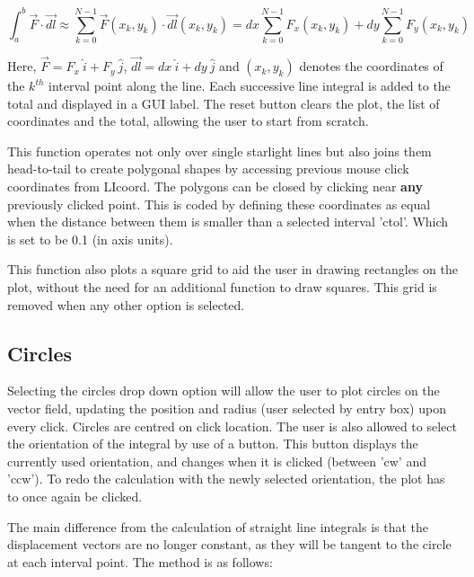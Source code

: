 \documentclass[11]{report}
\begin{document}
\begin{equation}
	\int_{a}^{b} \vec{F} \cdot \vec{dl} \approx \sum_{k=0}^{N-1} \vec{F}(x_k,y_k) \cdot \vec{dl}(x_k,y_k) = dx \sum_{k=0}^{N-1} F_x(x_k,y_k) + dy \sum_{k=0}^{N-1} F_y(x_k,y_k)
\end{equation}

Here, $\vec{F} = F_x \ \hat{i} + F_y \ \hat{j}$, $\vec{dl} = dx \ \hat{i} + dy \ \hat{j}$ and $(x_k,y_k)$ denotes the coordinates of the $k^{th}$ interval point along the line. Each successive line integral is added to the total and displayed in a GUI label. The reset button clears the plot, the list of coordinates and the total, allowing the user to start from scratch.

\noindent This function operates not only over single starlight lines but also joins them head-to-tail to create polygonal shapes by accessing previous mouse click coordinates from LI\textunderscore coord. The polygons can be closed by clicking near \textbf{any} previously clicked point. This is coded by defining these coordinates as equal when the distance between them is smaller than a selected interval 'ctol'. Which is set to be 0.1 (in axis units).

\noindent This function also plots a square grid to aid the user in drawing rectangles on the plot, without the need for an additional function to draw squares. This grid is removed when any other option is selected. 

\subsection{Circles}

Selecting the circles drop down option will allow the user to plot circles on the vector field, updating the position and radius (user selected by entry box) upon every click. Circles are centred on click location. The user is also allowed to select the orientation of the integral by use of a button. This button displays the currently used orientation, and changes when it is clicked (between 'cw' and 'ccw'). To redo the calculation with the newly selected orientation, the plot has to once again be clicked.

The main difference from the calculation of straight line integrals is that the displacement vectors are no longer constant, as they will be tangent to the circle at each interval point. The method is as follows: 
\end{document}
